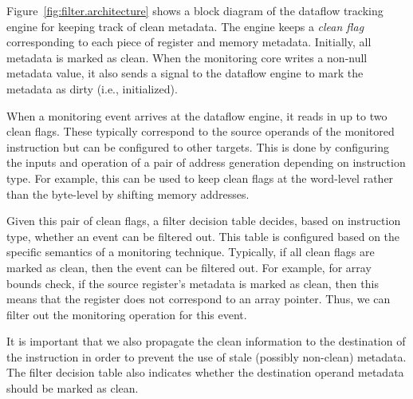 Figure~\ref{fig:filter.architecture} shows a block diagram of the dataflow
tracking engine for
keeping track of clean metadata. The engine keeps a \emph{clean flag}
corresponding to each piece of register and memory metadata. Initially, all
metadata is marked as clean.
When the monitoring core writes a non-null metadata value, it also sends a
signal to the dataflow engine to mark the metadata as dirty (i.e., initialized). 

When a monitoring event arrives at the dataflow engine,
it reads in up to two clean flags. These typically correspond to the source
operands of the monitored instruction but can be configured to other targets. 
This is done by configuring the inputs and operation of a pair of address
generation depending on instruction type.
For example, this can be used to keep clean flags at the word-level rather than
the byte-level by shifting memory addresses.

Given this pair of clean flags, a filter decision table decides, based
on instruction type, whether an event can be filtered out. This table is
configured based on the specific semantics of a monitoring technique.
Typically, if all clean flags are marked as clean, then the
event can be filtered out. For example, for array bounds check, if the source
register's metadata is marked as clean, then this means that the
register does not correspond to an array pointer. Thus, we can filter out the
monitoring operation for this event. 

It is important that we also propagate the clean information to the destination
of the instruction in order to prevent the use of stale (possibly non-clean) metadata.
The filter decision table also indicates
whether the destination operand metadata should be marked as clean.
